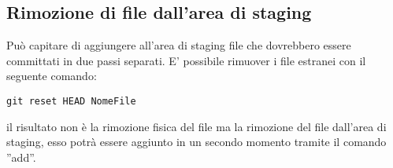 \subsection{Rimozione di file dall'area di staging}
Può capitare di aggiungere all'area di staging file che dovrebbero essere committati in due passi separati. E' possibile rimuover i file estranei con il seguente comando:

\begin{center}
\texttt{git reset HEAD NomeFile}
\end{center}

il risultato non è la rimozione fisica del file ma la rimozione del file dall'area di staging, esso potrà essere aggiunto in un secondo momento tramite il comando ''add''.